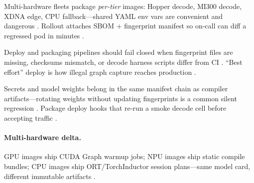 Multi-hardware fleets package \emph{per-tier} images: Hopper decode, MI300 decode, XDNA edge, CPU fallback---shared YAML env vars are convenient and dangerous \citep{amd2024xdna,amd2024aie,yirage2026,chen2020compilerbasedhardw,patel2025llminference,kwon2023vllm,liu2024deepseekv3,memoryfloor2026,taxbreak2026,dlbook,semianalysis2024tma,dao2022flashattention,dao2023flashdecoding,nvidia2024cudagraphs,nvidia2022hopper}. Rollout attaches SBOM + fingerprint manifest so on-call can diff a regressed pod in minutes \citep{patel2025llminference,yirage2026,chen2020compilerbasedhardw,memoryfloor2026,taxbreak2026,kwon2023vllm,liu2024deepseekv3,amd2024aie,dlbook,semianalysis2024tma,amd2024xdna,dao2022flashattention,dao2023flashdecoding,nvidia2024cudagraphs,nvidia2022hopper}.

Deploy and packaging pipelines should fail closed when fingerprint files are missing, checksums mismatch, or decode harness scripts differ from CI \citep{yirage2026,chen2020compilerbasedhardw,patel2025llminference,memoryfloor2026,taxbreak2026,kwon2023vllm,liu2024deepseekv3,amd2024aie,dlbook,semianalysis2024tma,amd2024xdna,dao2022flashattention,dao2023flashdecoding,nvidia2024cudagraphs,nvidia2022hopper}. ``Best effort'' deploy is how illegal graph capture reaches production \citep{nvidia2024cudagraphs,memoryfloor2026,kwon2023vllm,yirage2026,chen2020compilerbasedhardw,patel2025llminference,taxbreak2026,liu2024deepseekv3,amd2024aie,dlbook,semianalysis2024tma,amd2024xdna,dao2022flashattention,dao2023flashdecoding,nvidia2024cudagraphs,nvidia2022hopper}.

Secrets and model weights belong in the same manifest chain as compiler artifacts---rotating weights without updating fingerprints is a common silent regression \citep{patel2025llminference,kwon2023vllm,yirage2026,chen2020compilerbasedhardw,liu2024deepseekv3,memoryfloor2026,taxbreak2026,amd2024aie,dlbook,semianalysis2024tma,amd2024xdna,dao2022flashattention,dao2023flashdecoding,nvidia2024cudagraphs,nvidia2022hopper}. Package deploy hooks that re-run a smoke decode cell before accepting traffic \citep{memoryfloor2026,taxbreak2026,patel2025llminference,yirage2026,chen2020compilerbasedhardw,kwon2023vllm,liu2024deepseekv3,amd2024aie,dlbook,semianalysis2024tma,amd2024xdna,dao2022flashattention,dao2023flashdecoding,nvidia2024cudagraphs,nvidia2022hopper}.

\paragraph{Multi-hardware delta.} GPU images ship CUDA Graph warmup jobs; NPU images ship static compile bundles; CPU images ship ORT/TorchInductor session plans---same model card, different immutable artifacts \citep{nvidia2024cudagraphs,amd2024xdna,amd2024aie,dlbook,chen2020compilerbasedhardw,yirage2026,patel2025llminference,kwon2023vllm,liu2024deepseekv3,memoryfloor2026,taxbreak2026,semianalysis2024tma,dao2022flashattention,dao2023flashdecoding,nvidia2024cudagraphs,nvidia2022hopper}.

